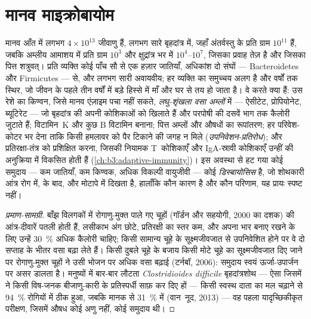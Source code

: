 \section{मानव माइक्रोबायोम}

\begin{definition}[आँत का समुदाय]\label{def:b3:microbiomes:gut}
मानव आँत में लगभग $4\times 10^{13}$ जीवाणु हैं, लगभग सारे बृहदांत्र
में, जहाँ अंतर्वस्तु के प्रति ग्राम $10^{11}$ हैं, जबकि अम्लीय आमाशय
में प्रति ग्राम $10^{3}$ और क्षुद्रांत्र भर में $10^{4}$--$10^{7}$,
जिसका प्रवाह तेज़ है और जिसका पित्त शत्रुवत्। प्रति व्यक्ति कोई पाँच सौ
से एक हज़ार जातियाँ, अधिकांश दो संघों --- Bacteroidetes और Firmicutes
--- से, और लगभग सारी अवायवीय; हर व्यक्ति का समुच्चय अलग है और वर्षों तक
स्थिर, जो जीवन के पहले तीन वर्षों में बड़े हिस्से में माँ और घर से तय हो
जाता है। वे करते क्या हैं: उस रेशे का किण्वन, जिसे मानव एंज़ाइम पचा
नहीं सकते, \emph{लघु-शृंखला वसा अम्लों} में --- ऐसीटेट, प्रोपियोनेट,
ब्यूटिरेट --- जो बृहदांत्र की अपनी कोशिकाओं को खिलाते हैं और परपोषी की
दसवें भाग तक कैलोरी जुटाते हैं; विटामिन~K और कुछ B विटामिन बनाना; पित्त
अम्लों और औषधों का रूपांतरण; हर परिवेश-कोटर भर देना ताकि किसी हमलावर को
पैर टिकाने की जगह न मिले (\emph{उपनिवेशन-प्रतिरोध}); और
प्रतिरक्षा-तंत्र को प्रशिक्षित करना, जिसकी नियामक T~कोशिकाएँ और
IgA-स्रावी कोशिकाएँ उन्हीं की अनुक्रिया में विकसित होती हैं
(\cref{ch:b3:adaptive-immunity})। इस अवस्था से हट गया कोई समुदाय ---
कम जातियाँ, कम किण्वक, अधिक विकल्पी वायुजीवी --- कोई
\emph{डिस्बायोसिस} है, जो शोथकारी आंत्र रोग में,  के बाद,
और मोटापे में दिखता है, हालाँकि कौन कारण है और कौन परिणाम, यह प्रायः
स्पष्ट नहीं।
\end{definition}

\begin{proof}[प्रमाण-सामग्री]
बाँझ विलगकों में रोगाणु-मुक्त पाले गए चूहों (गॉर्डन और सहयोगी, 2000 का
दशक) की आंत्र-दीवारें पतली होती हैं, लसीकाभ अंग छोटे, प्रतिरक्षी का
स्तर कम, और अपना भार बनाए रखने के लिए उन्हें \qty{30}{\%} अधिक कैलोरी
चाहिए; किसी सामान्य चूहे के सूक्ष्मजीवजात से उपनिवेशित होने पर वे दो
सप्ताह के भीतर वसा बढ़ा लेते हैं। किसी दुबले चूहे के बजाय किसी मोटे चूहे
का सूक्ष्मजीवजात दिए जाने पर रोगाणु-मुक्त चूहों ने उसी भोजन पर अधिक वसा
बढ़ाई (टर्नबॉ, 2006): समुदाय स्वयं ऊर्जा-उपार्जन पर असर डालता है।
मनुष्यों में बार-बार लौटता \emph{Clostridioides difficile}
बृहदांत्रशोथ --- ऐसा  जिसमें  ने किसी विष-जनक
बीजाणु-कारी के प्रतिस्पर्धी साफ़ कर दिए हों --- किसी स्वस्थ दाता का मल
चढ़ाने से \qty{94}{\%} रोगियों में ठीक हुआ, जबकि मानक  से
\qty{31}{\%} में (वान~नूद, 2013) --- वह पहला यादृच्छिकीकृत परीक्षण,
जिसमें औषध कोई अणु नहीं, कोई समुदाय थी।
\end{proof}

